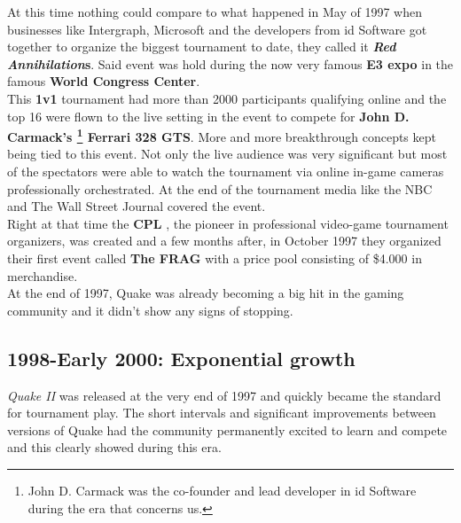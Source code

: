 At this time nothing could compare to what happened in May of 1997 when businesses like Intergraph, Microsoft and the developers from id Software got together to organize the biggest tournament to date, they called it \textbf{\textit{Red Annihilation}s}. Said event was hold during the now very famous \textbf{E3 expo} \cite{e3} in the famous \textbf{World Congress Center}.\\

This \textbf{1v1} tournament had more than 2000 participants qualifying online and the top 16 were flown to the live setting in the event to compete for \textbf{John D. Carmack's \footnote{John D. Carmack was the co-founder and lead developer in id Software during the era that concerns us.} Ferrari 328 GTS}. More and more breakthrough concepts kept being tied to this event. Not only the live audience was very significant but most of the spectators were able to watch the tournament via online in-game cameras professionally orchestrated. At the end of the tournament media like the NBC and The Wall Street Journal covered the event.\\

Right at that time the \textbf{CPL} \citep{web:cpl}, the pioneer in professional video-game tournament organizers, was created and a few months after, in October 1997 they organized their first event called \textbf{The FRAG} with a price pool consisting of \$4.000 in merchandise.\\

At the end of 1997, Quake was already becoming a big hit in the gaming community and it didn't show any signs of stopping.\\

\subsection{1998-Early 2000: Exponential growth}


\textit{Quake II} \citep{game:quake2} was released at the very end of 1997 and quickly became the standard for tournament play. The short intervals and significant improvements between versions of Quake had the community permanently excited to learn and compete and this clearly showed during this era.\\

